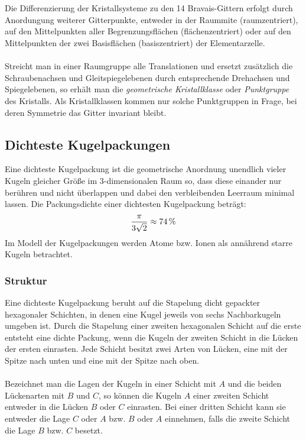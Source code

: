 \documentclass[a4paper,titlepage]{scrartcl}
\numberwithin{equation}{section}
\begin{document}
\cite{bravais}\\ \\
Die Differenzierung der Kristallsysteme zu den 14 Bravais-Gittern erfolgt durch Anordungung weiterer Gitterpunkte, entweder in der Raummite (raumzentriert), auf den Mittelpunkten aller Begrenzungsflächen (flächenzentriert) oder auf den Mittelpunkten der zwei Basisflächen (basiszentriert) der Elementarzelle. \cite{bravais}\\ \\
Streicht man in einer Raumgruppe alle Translationen und ersetzt zusätzlich die Schraubenachsen und Gleitspiegelebenen durch entsprechende Drehachsen und Spiegelebenen, so erhält man die \emph{geometrische Kristallklasse} oder \emph{Punktgruppe} des Kristalls. Als Kristallklassen kommen nur solche Punktgruppen in Frage, bei deren Symmetrie das Gitter invariant bleibt. \cite{wiki:punktgruppe}
\subsection{Dichteste Kugelpackungen \cite{wiki:kugelpackung} \cite{vorbereitungsMappe} \cite{kittel}}
Eine dichteste Kugelpackung ist die geometrische Anordnung unendlich vieler Kugeln gleicher Größe im 3-dimensionalen Raum so, dass diese einander nur berühren und nicht überlappen und dabei den verbleibenden Leerraum minimal lassen. Die Packungsdichte einer dichtesten Kugelpackung beträgt:
\begin{equation*}
\frac{\pi}{3 \sqrt{2}}\approx\unit[74]{\%}
\end{equation*}
Im Modell der Kugelpackungen werden Atome bzw. Ionen als annährend starre Kugeln betrachtet.
\subsubsection{Struktur}
Eine dichteste Kugelpackung beruht auf die Stapelung dicht gepackter hexagonaler Schichten, in denen eine Kugel jeweils von sechs Nachbarkugeln umgeben ist. Durch die Stapelung einer zweiten hexagonalen Schicht auf die erste entsteht eine dichte Packung, wenn die Kugeln der zweiten Schicht in die Lücken der ersten einrasten. Jede Schicht besitzt zwei Arten von Lücken, eine mit der Spitze nach unten und eine mit der Spitze nach oben.\\ \\
Bezeichnet man die Lagen der Kugeln in einer Schicht mit $A$ und die beiden Lückenarten mit $B$ und $C$,  so können die Kugeln $A$ einer zweiten Schicht entweder in die Lücken $B$ oder $C$ einrasten. Bei einer dritten Schicht kann sie entweder die Lage $C$ oder $A$ bzw. $B$ oder $A$ einnehmen, falls die zweite Schicht die Lage $B$ bzw. $C$ besetzt.
\end{document}
